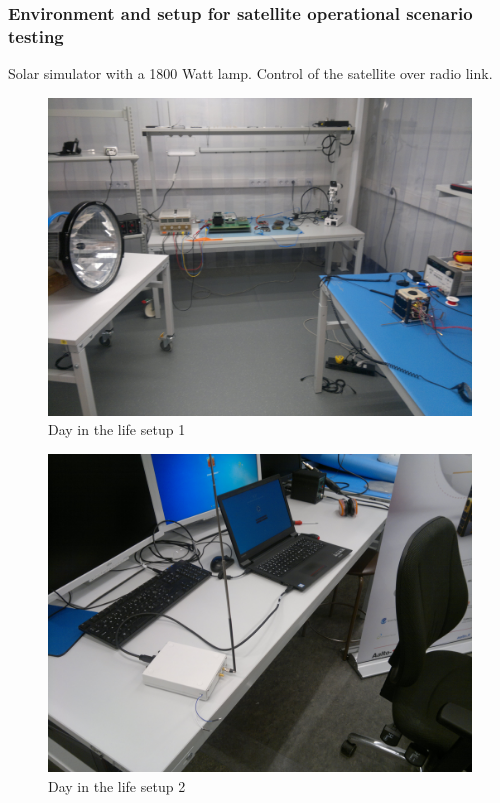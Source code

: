 \documentclass[english,12pt,a4paper,pdftex,elec,utf8]{aaltothesis}
\begin{document}
\subsubsection{Environment and setup for satellite operational scenario testing}
Solar simulator with a 1800 Watt lamp. Control of the satellite over radio link.
\begin{figure}[h!]
\includegraphics[scale=0.3]{daysetuplamp1}
\caption{Day in the life setup 1}
\end{figure} 
\begin{figure}[h!]
\includegraphics[scale=0.3]{daysetuplink}
\caption{Day in the life setup 2}
\end{figure} 
\end{document}
